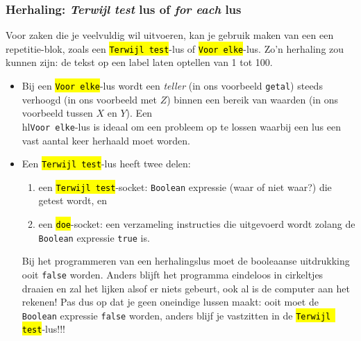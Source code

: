 \subsubsection{Herhaling: \emph{Terwijl test} lus of \emph{for each} lus}

Voor zaken die je veelvuldig wil uitvoeren, kan je gebruik maken van een een repetitie-blok, zoals een \hl{\texttt{Terwijl test}}-lus of \hl{\texttt{Voor elke}}-lus. 
Zo'n herhaling zou kunnen zijn: de tekst op een label laten optellen van 1 tot 100.


\begin{itemize}
	\item Bij een \hl{\texttt{Voor elke}}-lus wordt een \emph{teller} (in ons voorbeeld \texttt{getal}) steeds verhoogd (in ons voorbeeld met $Z$) binnen een bereik van waarden (in ons voorbeeld tussen $X$ en $Y$). Een \\hl{\texttt{Voor elke}}-lus is ideaal om een probleem op te lossen waarbij een lus een vast aantal keer herhaald moet worden.

	\item Een \hl{\texttt{Terwijl test}}-lus heeft twee delen: 
	\begin{enumerate}
		\item een \hl{\texttt{Terwijl test}}-socket: \texttt{Boolean} expressie (waar of niet waar?) die getest wordt, en 
		\item een \hl{\texttt{doe}}-socket: een verzameling instructies die uitgevoerd wordt zolang de \texttt{Boolean} expressie \texttt{true} is.
	\end{enumerate}
	Bij het programmeren van een herhalingslus moet de booleaanse uitdrukking ooit \texttt{false} worden. Anders blijft het programma eindeloos in cirkeltjes draaien en zal het lijken alsof er niets gebeurt, ook al is de computer aan het rekenen!
	Pas dus op dat je geen oneindige lussen maakt: ooit moet de \texttt{Boolean} expressie \texttt{false} worden, anders blijf je vastzitten in de \hl{\texttt{Terwijl test}}-lus!!!
\end{itemize}


